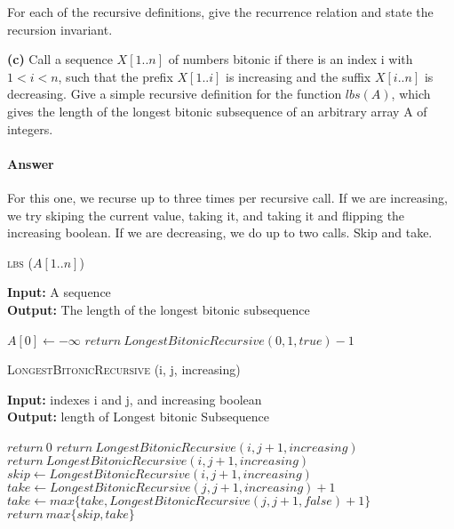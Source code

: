 \documentclass{article}
\begin{document}
For each of the recursive definitions, give the recurrence
relation and state the recursion invariant.

{\bf (c)} Call a sequence $X[1.. n]$ of numbers bitonic if there is an index i with
$1 < i < n$, such that the prefix $X[1.. i]$ is increasing and the suffix
$X[i .. n]$ is decreasing. Give a simple recursive definition for the function
$lbs(A)$, which gives the length of the longest bitonic subsequence of an
arbitrary array A of integers.

\paragraph{Answer}

For this one, we recurse up to three times per recursive call. If we are increasing, we try
skiping the current value, taking it, and taking it and flipping the increasing boolean.
If we are decreasing, we do up to two calls. Skip and take.

\begin{algorithm} \caption{\textsc{lbs} ($A[1..n]$)}\label{alg:seb}
    {\bf Input:} A sequence\\
    {\bf Output:} The length of the longest bitonic subsequence
    \begin{algorithmic}[1]
        \State$A[0] \gets -\infty$
        \State$return\ LongestBitonicRecursive(0, 1, true) -1$
    \end{algorithmic}
\end{algorithm}

\begin{algorithm} \caption{\textsc{LongestBitonicRecursive} (i, j, increasing)}\label{alg:seb}
    {\bf Input:} indexes i and j, and increasing boolean\\
    {\bf Output:} length of Longest bitonic Subsequence
    \begin{algorithmic}[1]
            \State$return\ 0$
                \State$return\ LongestBitonicRecursive(i, j+1, increasing)$
            \EndIf{}
        \Else{}
                \State$return\ LongestBitonicRecursive(i, j+1, increasing)$
            \EndIf{}
        \EndIf{}
        \State$skip \gets LongestBitonicRecursive(i, j+1, increasing)$
        \State$take \gets LongestBitonicRecursive(j, j+1, increasing) +1$
            \State$take \gets max\{take, LongestBitonicRecursive(j, j+1, false) +1\}$
        \EndIf{}
        \State$return\ max\{skip, take\}$
    \end{algorithmic}
\end{algorithm}
\end{document}
